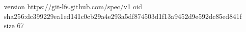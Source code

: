 version https://git-lfs.github.com/spec/v1
oid sha256:dc399229ea1ed141c0cb29a4e293a5df874503d1f13a9452d9e592dc85ed841f
size 67

